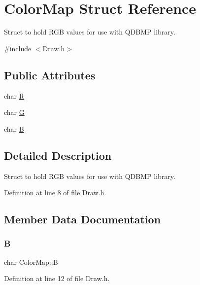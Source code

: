 \hypertarget{struct_color_map}{}\section{Color\+Map Struct Reference}
\label{struct_color_map}


Struct to hold R\+GB values for use with Q\+D\+B\+MP library.  




{\ttfamily \#include $<$Draw.\+h$>$}

\subsection*{Public Attributes}
\begin{DoxyCompactItemize}
\item 
char \mbox{\hyperlink{struct_color_map_a23346cc90a7c2bc2fb2f1e046a45e0f3}{R}}
\item 
char \mbox{\hyperlink{struct_color_map_ad722a73ff4260dba4d5ab18e6fde94ad}{G}}
\item 
char \mbox{\hyperlink{struct_color_map_a186d05bea2989483a1f9a1fb6c19da93}{B}}
\end{DoxyCompactItemize}


\subsection{Detailed Description}
Struct to hold R\+GB values for use with Q\+D\+B\+MP library. 

Definition at line 8 of file Draw.\+h.



\subsection{Member Data Documentation}
\mbox{\label{struct_color_map_a186d05bea2989483a1f9a1fb6c19da93}} 
\subsubsection{\texorpdfstring{B}{B}}
{\footnotesize\ttfamily char Color\+Map\+::B}



Definition at line 12 of file Draw.\+h.

\mbox{\label{struct_color_map_ad722a73ff4260dba4d5ab18e6fde94ad}} 
